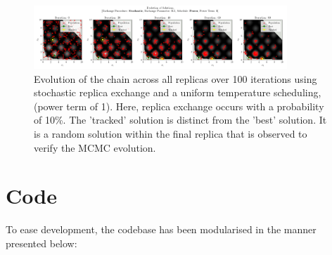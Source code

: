 \documentclass[10pt]{article}
\begin{document}
\begin{figure}[H]
    \centering
    \includegraphics[width=0.85\textwidth]{../figures/KBF/100_iters/Stochastic/Power/0.1_1_Solutions.png}
    \captionsetup{justification=centering}
    \caption{Evolution of the chain across all replicas over 100 iterations using stochastic replica exchange and a uniform temperature scheduling, (power term of 1). Here, replica exchange occurs with a probability of 10\%.  The 'tracked' solution is distinct from the 'best' solution. It is a random solution within the final replica that is observed to verify the MCMC evolution.}
    \label{fig:StochasticApp}
\end{figure}

\section{Code}
\label{sec:code}

To ease development, the codebase has been modularised in the manner presented below:
\end{document}
